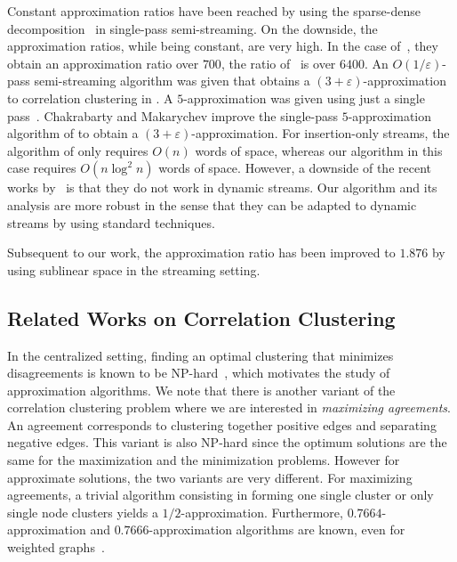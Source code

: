 \documentclass{theoretics}
\newcommand{\eps}{\ensuremath{\varepsilon}}
\begin{document}
Constant approximation ratios have been reached by using  the sparse-dense decomposition~\cite{cohen2021correlation, assadi2022} in single-pass semi-streaming.
On the downside, the approximation ratios, while being constant, are very high.
In the case of~\cite{cohen2021correlation}, they obtain an approximation ratio over $700$, the ratio of~\cite{assadi2022} is over $6400$. 
An $O(1/\eps)$-pass semi-streaming algorithm was given that obtains a $(3 + \eps)$-approximation to correlation clustering in \cite{Behnezhad2022}. A $5$-approximation was given using just a single pass~\cite{behnezhad2023single}.
Chakrabarty and Makarychev \cite{chakrabarty2023singlepass} improve the single-pass $5$-approximation algorithm of \cite{behnezhad2023single} to obtain a $(3 + \eps)$-approximation. For insertion-only streams, the algorithm of \cite{chakrabarty2023singlepass} only requires $O(n)$ words of space, whereas our algorithm in this case requires $O(n\log^2 n)$ words of space. However, a downside of the recent works by~\cite{Behnezhad2022, behnezhad2023single, chakrabarty2023singlepass} is that they do not work in dynamic streams.
Our algorithm and its analysis are more robust in the sense that they can be adapted to dynamic streams by using standard techniques.

\begin{remark}
    Subsequent to our work, the approximation ratio has been improved to $1.876$ by~\cite{DBLP:conf/stoc/Cohen-AddadLPTY24} using sublinear space in the streaming setting. 
\end{remark}


\subsection{Related Works on Correlation Clustering}
\label{sec:previouswork}

In the centralized setting, finding an optimal clustering that minimizes disagreements is known to be NP-hard~\cite{bansal2004correlation}, which motivates the study of approximation algorithms.
We note that there is another variant of the correlation clustering problem where we are interested in \emph{maximizing agreements}. An agreement corresponds to clustering together positive edges and separating negative edges. This variant is also NP-hard since the optimum solutions are the same for the maximization and the minimization problems.
However for approximate solutions, the two variants are very different.
For maximizing agreements, a trivial algorithm consisting in forming one single cluster or only single node clusters yields a $1/2$-approximation.
Furthermore, $0.7664$-approximation and $0.7666$-approximation algorithms are known, even for weighted graphs~\cite{swamy2004correlation, charikar2005clustering}.
\end{document}
